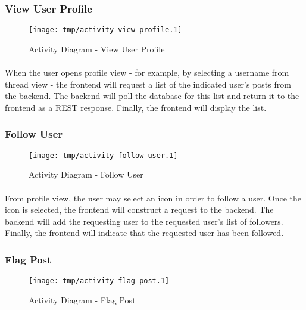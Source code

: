         \subsubsection{View User Profile}
        \begin{figure}[H]
            \centering
            \texttt{[image: tmp/activity-view-profile.1]} 
            \caption{Activity Diagram - View User Profile}
        \end{figure}

        \paragraph*{}
        When the user opens profile view - for example, by selecting a username from
        thread view - the frontend will request a list of the indicated user's posts
        from the backend. The backend will poll the database for this list and return
        it to the frontend as a REST response. Finally, the frontend will display the
        list.

        \subsubsection{Follow User}
        \begin{figure}[H]
            \centering
            \texttt{[image: tmp/activity-follow-user.1]} 
            \caption{Activity Diagram - Follow User}
        \end{figure}

        \paragraph*{}
        From profile view, the user may select an icon in order to follow a user. Once
        the icon is selected, the frontend will construct a request to the backend. The
        backend will add the requesting user to the requested user's list of followers.
        Finally, the frontend will indicate that the requested user has been followed.

        \subsubsection{Flag Post}
        \begin{figure}[H]
            \centering
            \texttt{[image: tmp/activity-flag-post.1]} 
            \caption{Activity Diagram - Flag Post}
        \end{figure}

